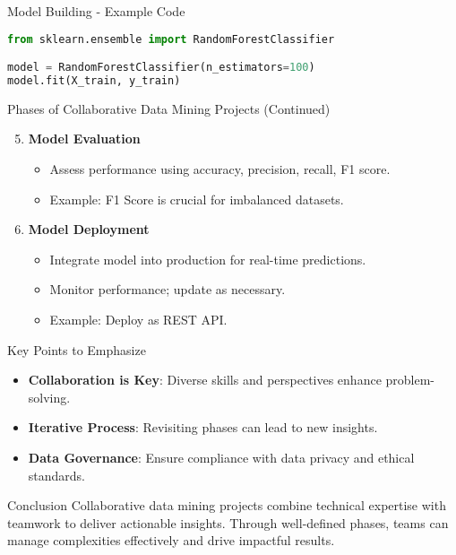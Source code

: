 \documentclass[aspectratio=169]{beamer}
\begin{document}
\begin{frame}[fragile]{Model Building - Example Code}
    \begin{lstlisting}[language=Python]
from sklearn.ensemble import RandomForestClassifier

model = RandomForestClassifier(n_estimators=100)
model.fit(X_train, y_train)
    \end{lstlisting}
\end{frame}

\begin{frame}{Phases of Collaborative Data Mining Projects (Continued)}
    \begin{enumerate}
        \setcounter{enumi}{4}
        \item \textbf{Model Evaluation}
            \begin{itemize}
                \item Assess performance using accuracy, precision, recall, F1 score.
                \item Example: F1 Score is crucial for imbalanced datasets.
            \end{itemize}

        \item \textbf{Model Deployment}
            \begin{itemize}
                \item Integrate model into production for real-time predictions.
                \item Monitor performance; update as necessary.
                \item Example: Deploy as REST API.
            \end{itemize}
    \end{enumerate}
\end{frame}

\begin{frame}{Key Points to Emphasize}
    \begin{itemize}
        \item \textbf{Collaboration is Key}: Diverse skills and perspectives enhance problem-solving.
        \item \textbf{Iterative Process}: Revisiting phases can lead to new insights.
        \item \textbf{Data Governance}: Ensure compliance with data privacy and ethical standards.
    \end{itemize}
\end{frame}

\begin{frame}{Conclusion}
    Collaborative data mining projects combine technical expertise with teamwork to deliver actionable insights. Through well-defined phases, teams can manage complexities effectively and drive impactful results.
\end{frame}
\end{document}
